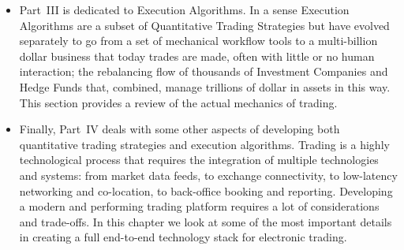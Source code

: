 \begin{itemize}
\item Part~III is dedicated to Execution Algorithms. In a sense Execution Algorithms are a subset of Quantitative Trading Strategies but have evolved separately to go from a set of mechanical workflow tools to a multi-billion dollar business that today trades are made, often with little or no human interaction; the rebalancing flow of thousands of Investment Companies and Hedge Funds that, combined, manage trillions of dollar in assets in this way. This section provides a review of the actual mechanics of trading. 

\item Finally, Part~IV deals with some other aspects of developing both quantitative trading strategies and execution algorithms. Trading is a highly technological process that requires the integration of multiple technologies and systems: from market data feeds, to exchange connectivity, to low-latency networking and co-location, to back-office booking and reporting. Developing a modern and performing trading platform requires a lot of considerations and trade-offs. In this chapter we look at some of the most important details in creating a full end-to-end technology stack for electronic trading.
\end{itemize} 
